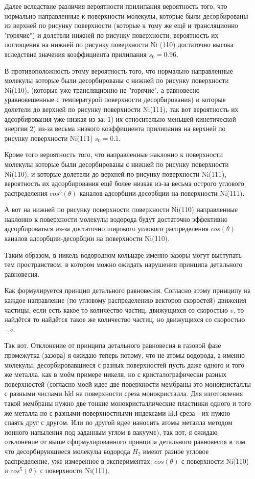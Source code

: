 \documentclass[11pt]{article}
\begin{document}
Далее вследствие различия вероятности прилипания вероятность того, что
нормально направленные к поверхности молекулы, которые были
десорбированы из верхней по рисунку поверхности (которые к тому же ещё и
трансляционно "горячие") и долетели нижней по рисунку поверхности,
вероятность их поглощения на нижней по рисунку поверхности Ni (110)
достаточно высока вследствие значения коэффициента прилипания
\(s_0 = 0.96\).

В противоположность этому вероятность того, что нормально направленные
молекулы которые были десорбированы с нижней по рисунку поверхности
Ni(110), (которые уже трансляционно не "горячие", а равновесно
уравновешенные с температурой поверхности десорбирования) и которые
долетели до верхней по рисунку поверхности Ni(111), так вот вероятность
их адсорбирования уже низкая из за: 1) их относительно меньшей
кинетической энергии 2) из-за весьма низкого коэффициента прилипания на
верхней по рисунку поверхности Ni(111) \(s_0=0.1\).

Кроме того вероятность того, что направленные наклонно к поверхности
молекулы которые были десорбированы с нижней по рисунку поверхности
Ni(110), и которые долетели до верхней по рисунку поверхности Ni(111),
вероятность их адсорбирования ещё более низкая из-за весьма острого
углового распределения \(cos^5(\theta)\) каналов адсорбции-десорбции на
поверхности Ni(111).

А вот на нижней по рисунку поверхности поверхности Ni(110) направленные
наклонно к поверхности молекулы водорода будут достаточно эффективно
адсорбироваться из-за достаточно широкого углового распределения
\(cos(\theta)\) каналов адсорбции-десорбции на поверхности Ni(110).

    Таким образом, в никель-водородном кольцаре именно зазоры могут
выступать тем пространством, в котором можно ожидать нарушения принципа
детального равновесия.

    Как формулируется принцип детального равновесия. Согласно этому принципу
на каждое направление (по угловому распределению векторов скоростей)
движения частицы, если есть какое то количество частиц, движущихся со
скоростью \(v\), то найдётся то найдётся такое же количество частиц, но
движущихся со скоростью \(-v\).

Так вот. Отклонение от принципа детального равновесия в газовой фазе
промежутка (зазора) я ожидаю теперь потому, что не атомы водорода, а
именно молекулы, десорбировавшиеся с разных поверхностей пусть даже
одного и того же металла, как в моём примере никеля, но с
кристалографически разных поверхностей (согласно моей идее две
поверхности мембраны это монокристаллы с разными числами hkl на
поверхности среза монокристалла. Для изготовления такой мембраны нужно
две тонкие монокристаллические пластинки одного и того же металла но с
разными поверхностными индексами hkl среза - их нужно спаять друг с
другом. Или по другой идее наносить атомы металла методом ионного
напыления под заданным углом в вакууме), так вот, я ожидаю отклонение от
выше сформулированного принципа детального равновесия в том что
десорбирующиеся молекулы водорода \(H_2\) имеют разное угловое
распределение, уже измеренное в экспериментах: \(cos(\theta)\) с
поверхности Ni(110) и \(cos^5(\theta)\) с поверхности Ni(111).
\end{document}
